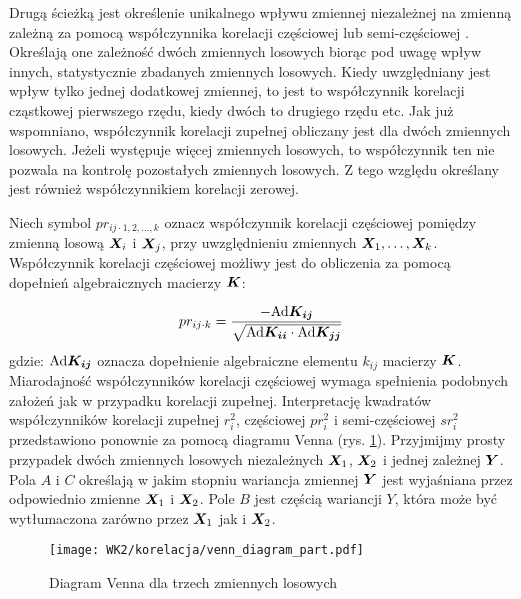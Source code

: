 \begin{appendices}
Drugą ścieżką jest określenie unikalnego wpływu zmiennej niezależnej na zmienną zależną za pomocą współczynnika korelacji częściowej  lub semi-częściowej . Określają one zależność dwóch zmiennych losowych biorąc pod uwagę wpływ innych, statystycznie zbadanych zmiennych losowych. Kiedy uwzględniany jest wpływ tylko jednej dodatkowej zmiennej, to jest to współczynnik korelacji cząstkowej pierwszego rzędu, kiedy dwóch to drugiego rzędu etc. Jak już wspomniano, współczynnik korelacji zupełnej obliczany jest dla dwóch zmiennych losowych. Jeżeli występuje więcej zmiennych losowych, to współczynnik ten nie pozwala na kontrolę pozostałych zmiennych losowych. Z tego względu określany jest również współczynnikiem korelacji zerowej. 

Niech symbol $pr_{ij\cdot 1,2,\dots,k}$ oznacz współczynnik korelacji częściowej pomiędzy zmienną losową $\bm{X}_i$ i $\bm{X}_j$, przy uwzględnieniu zmiennych $\bm{X}_1,\dots,\bm{X}_k$. Współczynnik korelacji częściowej możliwy jest do obliczenia za pomocą dopełnień algebraicznych macierzy $\bm{K}$:

\begin{equation}
		pr_{ij\cdot k} = \frac{-\mathrm{Ad}\bm{K_{ij}}}{\sqrt{\mathrm{Ad}\bm{K_{ii}}\cdot\mathrm{Ad}\bm{K_{jj}}}}
\end{equation}
gdzie: $\mathrm{Ad}\bm{K_{ij}}$ oznacza dopełnienie algebraiczne elementu $k_{ij}$ macierzy $\bm{K}$. Miarodajność współczynników korelacji częściowej wymaga spełnienia podobnych założeń jak w przypadku korelacji zupełnej.
\clearpage
Interpretację kwadratów współczynników korelacji zupełnej $r_i^2$, częściowej $pr_i^2$ i semi-częściowej $sr_i^2$ przedstawiono ponownie za pomocą diagramu Venna (rys. \ref{fig:venn_diag_part_corr}). Przyjmijmy prosty przypadek dwóch zmiennych losowych niezależnych $\bm{X}_1$, $\bm{X}_2$ i jednej zależnej $\bm{Y}$. Pola $A$ i $C$ określają w jakim stopniu wariancja zmiennej $\bm{Y}$ jest wyjaśniana przez odpowiednio zmienne $\bm{X}_1$ i $\bm{X}_2$. Pole $B$ jest częścią wariancji $Y$, która może być wytłumaczona zarówno przez $\bm{X}_1$ jak i $\bm{X}_2$.

\begin{figure}[hbt!]
	\centering
	\texttt{[image: WK2/korelacja/venn\_diagram\_part.pdf]}
	\captionsetup{justification=centering}
	\caption{Diagram Venna dla trzech zmiennych losowych}
	\label{fig:venn_diag_part_corr}
\end{figure}


\end{appendices}

